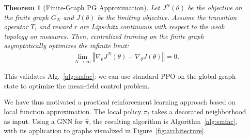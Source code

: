 \documentclass{article}
\newtheorem{theorem}{Theorem}
\begin{document}
\begin{theorem}[Finite-Graph PG Approximation] \label{thm:ctde}
    Let $J^N(\theta)$ be the objective on the finite graph $G_N$ and $J(\theta)$ be the limiting objective. Assume the transition operator $T_t$ and reward $r$ are Lipschitz continuous with respect to the weak topology on measures. Then, centralized training on the finite graph asymptotically optimizes the infinite limit:
    \begin{align*}
        \lim_{N \to \infty} \left\Vert \nabla_\theta J^N(\theta) - \nabla_\theta J(\theta) \right\Vert = 0.
    \end{align*}
\end{theorem}
This validates Alg.~\ref{alg:smfac}: we can use standard PPO on the global graph state to optimize the mean-field control problem.

We have thus motivated a practical reinforcement learning approach
based on local function approximation.
The local policy $\pi_t$ takes a decorated neighborhood as input. Using a GNN for $\hat \pi$, the resulting algorithm is Algorithm~\ref{alg:smfac}, with its application to graphs visualized in Figure~\ref{fig:architecture}.
\end{document}
